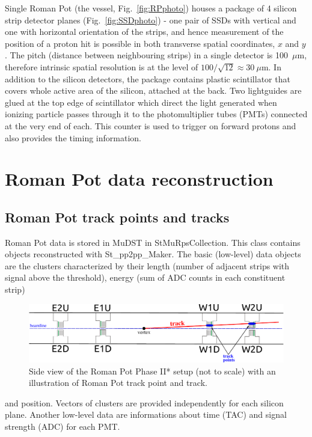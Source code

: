 Single Roman Pot (the vessel, Fig.~\ref{fig:RPphoto}) houses a package of 4 silicon strip detector planes (Fig.~\ref{fig:SSDphoto}) - one pair of SSDs with vertical and one with horizontal orientation of the strips, and hence measurement of the position of a proton hit is possible in both transverse spatial coordinates, $x$ and $y$. The pitch (distance between neighbouring strips) in a single detector is 100~$\mu$m, therefore intrinsic spatial resolution is at the level of $100/\sqrt{12}\approx30~\mu$m. In addition to the silicon detectors, the package contains plastic scintillator that covers whole active area of the silicon, attached at the back. Two lightguides are glued at the top edge of scintillator which direct the light generated when ionizing particle passes through it to the photomultiplier tubes (PMTs) connected at the very end of each. This counter is used to trigger on forward protons and also provides the timing information.

\section{Roman Pot data reconstruction}

\subsection{Roman Pot track points and tracks}

Roman Pot data is stored in MuDST in StMuRpsCollection. This class contains objects reconstructed with St\_pp2pp\_Maker. The basic (low-level) data objects are the clusters characterized by their length (number of adjacent strips with signal above the threshold), energy (sum of ADC counts in each constituent strip) %
\begin{figure}[hb]%
\centering\includegraphics[width=0.9\linewidth]{graphics/rpSim/trackDefinition.pdf}%
\caption[Side view of the Roman Pot Phase II* setup with an illustration of Roman Pot track point and track.]{Side view of the Roman Pot Phase II* setup (not to scale) with an illustration of Roman Pot track point and track.}\label{fig:RpTrackDefinition}%
\end{figure}%
and position. Vectors of clusters are provided independently for each silicon plane. Another low-level data are informations about time (TAC) and signal strength (ADC) for each PMT.

